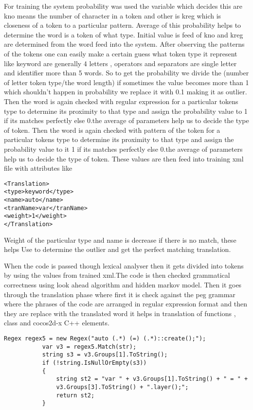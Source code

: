 \documentclass[23pt]{article}
\begin{document}
{\Large For training the system probability was used the variable which decides this are kno means the number of character in a token and other is kreg which is closeness of a token to a particular pattern. Average of this probability helps to determine the word is a token of what type. Initial value is feed of kno and kreg are determined from the word feed into the system. After observing the patterns of the tokens one can easily make a certain guess what token type it represent like keyword are generally 4 letters , operators and separators are single letter and identifier more than 5 words. So to get the probability we divide the (number of letter token type/the word length) if sometimes the value becomes more than 1 which shouldn’t happen in probability we replace it with 0.1 making it as outlier. Then the word is again checked with regular expression for a particular tokens type to determine its proximity to that type and assign the probability value to  1 if its matches perfectly else 0.the average of parameters help us to decide the type of token. Then the word is again checked with pattern of the token for a particular tokens type to determine its proximity to that type and assign the probability value to it 1 if its matches perfectly else 0.the average of parameters help us to decide the type of token. These values are then feed into training xml file with attributes like 
\begin{lstlisting}[label=some-code,caption= xml structure for training]
<Translation> 
<type>keyword</type> 
<name>auto</name> 
<tranName>var</tranName> 
<weight>1</weight> 
</Translation>
\end{lstlisting}

Weight of the particular type and name is decrease if there is no match, these helps
Use to determine the outlier and get the perfect matching translation. 

When the code is passed though lexical analyser then it gets divided into tokens by using the values from trained xml.The code is then checked grammatical correctness using look ahead algorithm and hidden markov model. Then it goes through the translation phase where first it is check against the peg grammar where the phrases of the code are arranged in regular expression format and then they are replace with the translated word it helps in translation of functions , class and cocos2d-x C++ elements.  \\ \par}


\begin{lstlisting}[label=some-code,caption= Example of peg grammar]
Regex regex5 = new Regex("auto (.*) (=) (.*)::create();");
           var v3 = regex5.Match(str);
           string s3 = v3.Groups[1].ToString();
           if (!string.IsNullOrEmpty(s3))
           {
               string st2 = "var " + v3.Groups[1].ToString() + " = " +
               v3.Groups[3].ToString() + ".layer();";
               return st2;
           }
\end{lstlisting}
\end{document}
